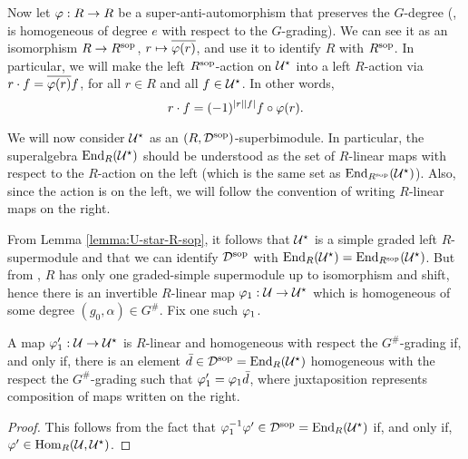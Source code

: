 Now let $\varphi: R\to R$ be a super-anti-automorphism that preserves the $G$-degree (\ie, is homogeneous of degree $e$ with respect to the $G$-grading).
We can see it as an isomorphism $R\to R^{\mathrm{sop}}$, $r \mapsto \overline{ \varphi(r)}$, and use it to identify $R$ with $R^{\mathrm{sop}}$.
In particular, we will make the left $R^{\mathrm{sop}}$-action on $\mathcal U^\star$ into a left $R$-action via $r\cdot f = \overline{\varphi(r)}f$, for all $r\in R$ and all $f\in \mathcal U^\star$.
In other words,
%
\begin{equation}\label{eq:R-action-back-on-the-right}
	r\cdot f = (-1)^{|r||f|} f \circ \varphi(r) .
\end{equation}

We will now consider $\mathcal U^\star$ as an $(R,\mathcal{D}^{\mathrm{sop}})$-superbimodule.
In particular, the superalgebra $\operatorname{End}_R(\mathcal U^\star)$ should be understood as the set of $R$-linear maps with respect to the $R$-action on the left (which is the same set as $\operatorname{End}_{R^{\mathrm{sop}}} (\mathcal U^\star)$).
Also, since the action is on the left, we will follow the convention of writing $R$-linear maps on the right.

From Lemma \ref{lemma:U-star-R-sop}, it follows that $\mathcal U^\star$ is a simple graded left $R$-supermodule and that we can identify $\mathcal{D}^{\mathrm{sop}}$ with $\operatorname{End}_R (\mathcal U^\star) = \operatorname{End}_{R^{\mathrm{sop}}} (\mathcal U^\star)$.
But from \cite[Lemma 2.7]{livromicha}, $R$ has only one graded-simple supermodule up to isomorphism and shift, hence there is an invertible $R$-linear map $\varphi_1: \mathcal U \to \mathcal U^\star$ which is homogeneous of some degree $(g_0, \alpha)\in G^\#$.
Fix one such $\varphi_1$.

\begin{lemma}\label{lemma:nonuniqueness-of-vphi1}
	A map $\varphi_1' : \mathcal U \to \mathcal U^\star$ is $R$-linear and homogeneous with respect the $G^\#$-grading if, and only if, there is an element $\bar d\in \mathcal{D}^{\mathrm{sop}} = \operatorname{End}_R (\mathcal U^\star)$ homogeneous with the respect the $G^\#$-grading such that $ \varphi_1' = \varphi_1 \bar d$, where juxtaposition represents composition of maps written on the right.
\end{lemma}

\begin{proof}
	This follows from the fact that $ \varphi_1^{-1} \varphi' \in  \mathcal{D}^{\mathrm{sop}} = \operatorname{End}_R(\mathcal U^\star)$ if, and only if, $\varphi' \in \operatorname{Hom}_R(\mathcal U, \mathcal U^\star)$.
\end{proof}


